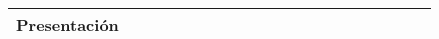 \begin{table}[H]
\begin{turn}{90}
\begin{tabular}{@{}llllllllllllllllllll@{}}
\multicolumn{1}{l|}{Presentación}                                                      & \multicolumn{1}{l|}{}                                                                   & \multicolumn{1}{l|}{}                         &                                                 &                          &                          & \multicolumn{1}{l|}{}                         &                          &                          &                          &                          & \multicolumn{1}{l|}{}                         &                          &                          &                          & \multicolumn{1}{l|}{}                         &                                               &                          &                          & \cellcolor[HTML]{000000} \\ \bottomrule
\end{tabular}
\end{turn}
\end{table}
